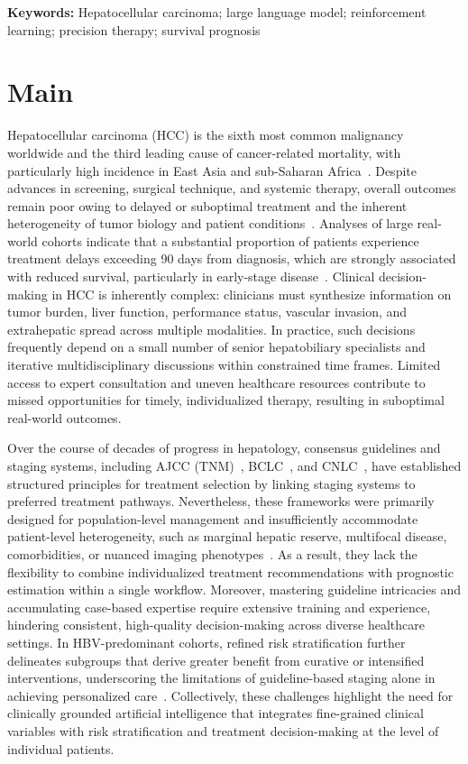 \documentclass{article}
\begin{document}
\textbf{Keywords:} Hepatocellular carcinoma; large language model; reinforcement learning; precision therapy; survival prognosis

\section{Main}\label{sec1}
Hepatocellular carcinoma (HCC) is the sixth most common malignancy worldwide and the third leading cause of cancer-related mortality, with particularly high incidence in East Asia and sub-Saharan Africa~\cite{chan2025lancet,bray2024global}. Despite advances in screening, surgical technique, and systemic therapy, overall outcomes remain poor owing to delayed or suboptimal treatment and the inherent heterogeneity of tumor biology and patient conditions~\cite{safri2024heterogeneity,rich2020hepatocellular}. Analyses of large real-world cohorts indicate that a substantial proportion of patients experience treatment delays exceeding 90 days from diagnosis, which are strongly associated with reduced survival, particularly in early-stage disease~\cite{cheo2024impact,govalan2022therapeutic}. Clinical decision-making in HCC is inherently complex: clinicians must synthesize information on tumor burden, liver function, performance status, vascular invasion, and extrahepatic spread across multiple modalities. In practice, such decisions frequently depend on a small number of senior hepatobiliary specialists and iterative multidisciplinary discussions within constrained time frames. Limited access to expert consultation and uneven healthcare resources contribute to missed opportunities for timely, individualized therapy, resulting in suboptimal real-world outcomes.

Over the course of decades of progress in hepatology, consensus guidelines and staging systems, including AJCC (TNM)~\cite{ajcc8_manual}, BCLC~\cite{Reig2022BCLC}, and CNLC~\cite{Zhou2023CNLC}, have established structured principles for treatment selection by linking staging systems to preferred treatment pathways. Nevertheless, these frameworks were primarily designed for population-level management and insufficiently accommodate patient-level heterogeneity, such as marginal hepatic reserve, multifocal disease, comorbidities, or nuanced imaging phenotypes~\cite{llovet_hepatocellular_2021}. As a result, they lack the flexibility to combine individualized treatment recommendations with prognostic estimation within a single workflow. Moreover, mastering guideline intricacies and accumulating case-based expertise require extensive training and experience, hindering consistent, high-quality decision-making across diverse healthcare settings. In HBV-predominant cohorts, refined risk stratification further delineates subgroups that derive greater benefit from curative or intensified interventions, underscoring the limitations of guideline-based staging alone in achieving personalized care~\cite{yau2014development}. Collectively, these challenges highlight the need for clinically grounded artificial intelligence that integrates fine-grained clinical variables with risk stratification and treatment decision-making at the level of individual patients.
\end{document}
